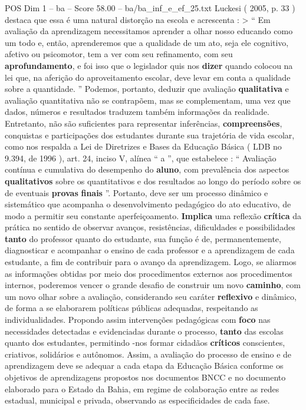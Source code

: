 \begin{textsample}{POS Dim 1 – ba – Score 58.00 – ba/ba\_inf\_e\_ef\_25.txt}
Luckesi ( 2005, p. 33 ) destaca que essa é uma natural distorção na escola e acrescenta : > “ Em avaliação da aprendizagem necessitamos aprender a olhar nosso educando como um todo e, então, aprenderemos que a qualidade de um ato, seja ele cognitivo, afetivo ou psicomotor, tem a ver com seu refinamento, com seu \textbf{aprofundamento}, e foi isso que o legislador quis nos \textbf{dizer} quando colocou na lei que, na aferição do aproveitamento escolar, deve levar em conta a qualidade sobre a quantidade. ” Podemos, portanto, deduzir que avaliação \textbf{qualitativa} e avaliação quantitativa não se contrapõem, mas se complementam, uma vez que dados, números e resultados traduzem também informações da realidade.
Entretanto, não são suficientes para representar inferências, \textbf{compreensões}, conquistas e participações dos estudantes durante sua trajetória de vida escolar, como nos respalda a Lei de Diretrizes e Bases da Educação Básica ( LDB no 9.394, de 1996 ), art. 24, inciso V, alínea “ a ”, que estabelece : “ Avaliação contínua e cumulativa do desempenho do \textbf{aluno}, com prevalência dos aspectos \textbf{qualitativos} sobre os quantitativos e dos resultados ao longo do período sobre os de eventuais \textbf{provas} \textbf{finais} ”.
Portanto, deve ser um processo dinâmico e sistemático que acompanha o desenvolvimento pedagógico do ato educativo, de modo a permitir seu constante aperfeiçoamento. \textbf{Implica} uma reflexão \textbf{crítica} da prática no sentido de observar avanços, resistências, dificuldades e possibilidades \textbf{tanto} do professor quanto do estudante, sua função é de, permanentemente, diagnosticar e acompanhar o ensino de cada professor e a aprendizagem de cada estudante, a fim de contribuir para o avanço da aprendizagem.
Logo, se aliarmos as informações obtidas por meio dos procedimentos externos aos procedimentos internos, poderemos vencer o grande desafio de construir um novo \textbf{caminho}, com um novo olhar sobre a avaliação, considerando seu caráter \textbf{reflexivo} e dinâmico, de forma a se elaborarem políticas públicas adequadas, respeitando as individualidades.
Propondo assim intervenções pedagógicas com \textbf{foco} nas necessidades detectadas e evidenciadas durante o processo, \textbf{tanto} das escolas quanto dos estudantes, permitindo -nos formar cidadãos \textbf{críticos} conscientes, criativos, solidários e autônomos.
Assim, a avaliação do processo de ensino e de aprendizagem deve se adequar a cada etapa da Educação Básica conforme os objetivos de aprendizagens propostos nos documentos BNCC e no documento elaborado para o Estado da Bahia, em regime de colaboração entre as redes estadual, municipal e privada, observando as especificidades de cada fase.

\end{textsample}

